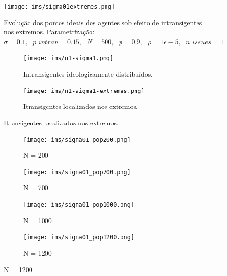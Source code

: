 \documentclass{beamer}
\begin{document}
\begin{frame}
  
      \begin{figure}[H]
    \centering
    \texttt{[image: ims/sigma01extremes.png]}
    \caption{ Evolução dos pontos ideais dos agentes sob efeito de
      intransigentes nos extremos. Parametrização: \( \sigma = 0.1, \text{ }
      p\_intran = 0.15, \text{ } N = 500, \text{ } p = 0.9, \text{ } \rho = 1e-5,
      \text{ } n\_issues = 1 \)}
    \label{fig:tseries3}
  \end{figure}
\end{frame}

\begin{frame}
      \begin{figure}[H]
    \centering
     \caption{ Intransigentes com \(\sigma = 0.01\). Parametrização global: \( \sigma =
       0.1, \text{ } p\_intran = 0.15, \text{ } N = 500, \text{ } p = 0.9,
       \text{ } \rho = 1e-5, \text{ } n\_issues = 1 \)}
    \begin{subfigure}[b]{0.49\textwidth}
      \texttt{[image: ims/n1-sigma1.png]}
      \caption{Intransigentes ideologicamente distribuídos.}
    \end{subfigure}
    \begin{subfigure}[b]{0.49\textwidth}
      \texttt{[image: ims/n1-sigma1-extremes.png]}
       \caption{Itransigentes localizados nos extremos.}
     \end{subfigure}
    \label{fig:newintrans}
     \end{figure}
\end{frame}

\begin{frame}
    \begin{figure}[H]
    \centering
     \caption{ Intransigentes com \(\sigma = 0.01\). Parametrização global: \( \sigma =
       0.1, \text{ } p\_intran = 0.15, \text{ } p = 0.9,
       \text{ } \rho = 1e-5, \text{ } n\_issues = 1 \)}
    \begin{subfigure}[b]{0.3\textwidth}
      \texttt{[image: ims/sigma01\_pop200.png]}
      \caption{N = 200}
    \end{subfigure}
    \begin{subfigure}[b]{0.3\textwidth}
      \texttt{[image: ims/sigma01\_pop700.png]}
       \caption{N = 700}
     \end{subfigure}

         \begin{subfigure}[b]{0.3\textwidth}
      \texttt{[image: ims/sigma01\_pop1000.png]}
       \caption{N = 1000}
     \end{subfigure}
         \begin{subfigure}[b]{0.3\textwidth}
      \texttt{[image: ims/sigma01\_pop1200.png]}
       \caption{N = 1200}
     \end{subfigure}
    \label{fig:newintrans2}
     \end{figure}
   \end{frame}
\end{document}
